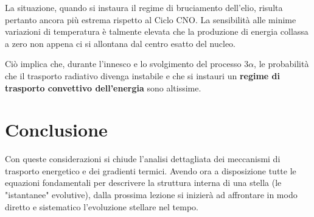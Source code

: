 La situazione, quando si instaura il regime di bruciamento dell'elio, risulta pertanto ancora più estrema rispetto al Ciclo CNO. La sensibilità alle minime variazioni di temperatura è talmente elevata che la produzione di energia collassa a zero non appena ci si allontana dal centro esatto del nucleo.

Ciò implica che, durante l'innesco e lo svolgimento del processo $3\alpha$, le probabilità che il trasporto radiativo divenga instabile e che si instauri un \textbf{regime di trasporto convettivo dell'energia} sono altissime.

\section{Conclusione}

Con queste considerazioni si chiude l'analisi dettagliata dei meccanismi di trasporto energetico e dei gradienti termici. Avendo ora a disposizione tutte le equazioni fondamentali per descrivere la struttura interna di una stella (le "istantanee" evolutive), dalla prossima lezione si inizierà ad affrontare in modo diretto e sistematico l'evoluzione stellare nel tempo.